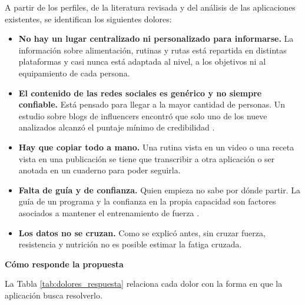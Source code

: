 A partir de los perfiles, de la literatura revisada y del análisis de las aplicaciones existentes, se identifican los siguientes dolores:
\begin{itemize}
    \item \textbf{No hay un lugar centralizado ni personalizado para informarse.} La información sobre alimentación, rutinas y rutas está repartida en distintas plataformas y casi nunca está adaptada al nivel, a los objetivos ni al equipamiento de cada persona.
    \item \textbf{El contenido de las redes sociales es genérico y no siempre confiable.} Está pensado para llegar a la mayor cantidad de personas. Un estudio sobre blogs de influencers encontró que solo uno de los nueve analizados alcanzó el puntaje mínimo de credibilidad \citep{sabbagh2020credibility}.
    \item \textbf{Hay que copiar todo a mano.} Una rutina vista en un video o una receta vista en una publicación se tiene que transcribir a otra aplicación o ser anotada en un cuaderno para poder seguirla.
    \item \textbf{Falta de guía y de confianza.} Quien empieza no sabe por dónde partir. La guía de un programa y la confianza en la propia capacidad son factores asociados a mantener el entrenamiento de fuerza \citep{rhodes2017resistance}.
    \item \textbf{Los datos no se cruzan.} Como se explicó antes, sin cruzar fuerza, resistencia y nutrición no es posible estimar la fatiga cruzada.
\end{itemize}
\textbf{Cómo responde la propuesta}

La Tabla \ref{tab:dolores_respuesta} relaciona cada dolor con la forma en que la aplicación busca resolverlo.

